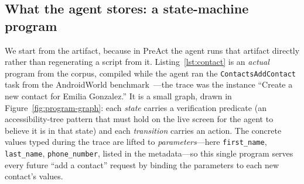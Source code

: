 \documentclass[11pt]{article}
\begin{document}
\subsection{What the agent stores: a state-machine program}
\label{sec:arch-program}

We start from the artifact, because in PreAct the agent runs that artifact directly rather than regenerating a script from it. Listing~\ref{lst:contact} is an \emph{actual} program from the corpus, compiled while the agent ran the \texttt{ContactsAddContact} task from the AndroidWorld benchmark~\cite{rawles2024androidworld}---the trace was the instance ``Create a new contact for Emilia Gonzalez.'' It is a small graph, drawn in Figure~\ref{fig:program-graph}: each \emph{state} carries a verification predicate (an accessibility-tree pattern that must hold on the live screen for the agent to believe it is in that state) and each \emph{transition} carries an action. The concrete values typed during the trace are lifted to \emph{parameters}---here \texttt{first\_name}, \texttt{last\_name}, \texttt{phone\_number}, listed in the metadata---so this single program serves every future ``add a contact'' request by binding the parameters to each new contact's values.
\end{document}
